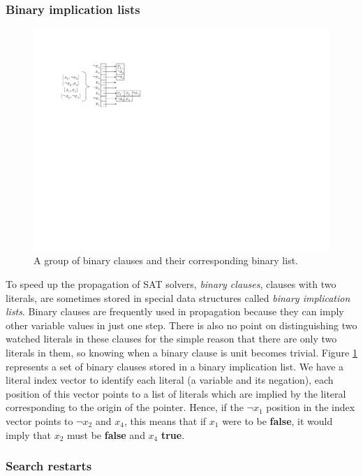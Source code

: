 \documentclass[12pt]{diicc}
\begin{document}
\subsubsection{Binary implication lists}

\begin{figure}[h!]
	\centering
		\includegraphics[scale=1]{binary_list}
	\caption{A group of binary clauses and their corresponding binary list.}
	\label{fig:binary list}
\end{figure}

To speed up the propagation of SAT solvers, \textit{binary clauses}, clauses with two literals, are sometimes stored in special data structures called \textit{binary implication lists}. Binary clauses are frequently used in propagation because they can imply other variable values in just one step. There is also no point on distinguishing two watched literals in these clauses for the simple reason that there are only two literals in them, so knowing when a binary clause is unit becomes trivial. Figure \ref{fig:binary list} represents a set of binary clauses stored in a binary implication list. We have a literal index vector to identify each literal (a variable and its negation), each position of this vector points to a list of literals which are implied by the literal corresponding to the origin of the pointer. Hence, if the $\neg x_{1}$ position in the index vector points to $\neg x_{2}$ and $x_{4}$, this means that if $x_{1}$ were to be \textbf{false}, it would imply that $x_{2}$ must be \textbf{false} and $x_{4}$ \textbf{true}.

\subsubsection{Search restarts}
\end{document}
